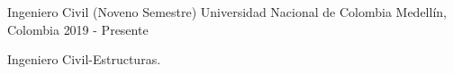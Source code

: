 

\begin{cventries}

  \cventry
    {Ingeniero Civil (Noveno Semestre)} %
    {Universidad Nacional de Colombia} %
    {Medellín, Colombia} %
    {2019 - Presente} %
    {
      \begin{cvitems} %
        \item {Ingeniero Civil-Estructuras.}
      \end{cvitems}
    }
\end{cventries}